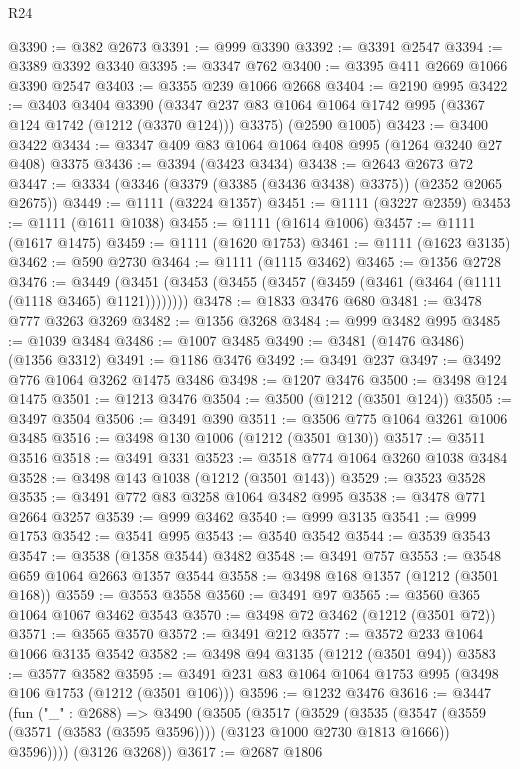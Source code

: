 \begin{lexlean}{R24}
\begin{coremodule}
@3390 := @382 @2673
@3391 := @999 @3390
@3392 := @3391 @2547
@3394 := @3389 @3392 @3340
@3395 := @3347 @762
@3400 := @3395 @411 @2669 @1066 @3390 @2547
@3403 := @3355 @239 @1066 @2668
@3404 := @2190 @995
@3422 := @3403
    @3404
    @3390
    (@3347 @237 @83 @1064 @1064 @1742 @995 (@3367 @124 @1742 (@1212 (@3370 @124))) @3375)
    (@2590 @1005)
@3423 := @3400 @3422
@3434 := @3347 @409 @83 @1064 @1064 @408 @995 (@1264 @3240 @27 @408) @3375
@3436 := @3394 (@3423 @3434)
@3438 := @2643 @2673 @72
@3447 := @3334 (@3346 (@3379 (@3385 (@3436 @3438) @3375)) (@2352 @2065 @2675))
@3449 := @1111 (@3224 @1357)
@3451 := @1111 (@3227 @2359)
@3453 := @1111 (@1611 @1038)
@3455 := @1111 (@1614 @1006)
@3457 := @1111 (@1617 @1475)
@3459 := @1111 (@1620 @1753)
@3461 := @1111 (@1623 @3135)
@3462 := @590 @2730
@3464 := @1111 (@1115 @3462)
@3465 := @1356 @2728
@3476 := @3449 (@3451 (@3453 (@3455 (@3457 (@3459 (@3461 (@3464 (@1111 (@1118 @3465) @1121))))))))
@3478 := @1833 @3476 @680
@3481 := @3478 @777 @3263 @3269
@3482 := @1356 @3268
@3484 := @999 @3482 @995
@3485 := @1039 @3484
@3486 := @1007 @3485
@3490 := @3481 (@1476 @3486) (@1356 @3312)
@3491 := @1186 @3476
@3492 := @3491 @237
@3497 := @3492 @776 @1064 @3262 @1475 @3486
@3498 := @1207 @3476
@3500 := @3498 @124 @1475
@3501 := @1213 @3476
@3504 := @3500 (@1212 (@3501 @124))
@3505 := @3497 @3504
@3506 := @3491 @390
@3511 := @3506 @775 @1064 @3261 @1006 @3485
@3516 := @3498 @130 @1006 (@1212 (@3501 @130))
@3517 := @3511 @3516
@3518 := @3491 @331
@3523 := @3518 @774 @1064 @3260 @1038 @3484
@3528 := @3498 @143 @1038 (@1212 (@3501 @143))
@3529 := @3523 @3528
@3535 := @3491 @772 @83 @3258 @1064 @3482 @995
@3538 := @3478 @771 @2664 @3257
@3539 := @999 @3462
@3540 := @999 @3135
@3541 := @999 @1753
@3542 := @3541 @995
@3543 := @3540 @3542
@3544 := @3539 @3543
@3547 := @3538 (@1358 @3544) @3482
@3548 := @3491 @757
@3553 := @3548 @659 @1064 @2663 @1357 @3544
@3558 := @3498 @168 @1357 (@1212 (@3501 @168))
@3559 := @3553 @3558
@3560 := @3491 @97
@3565 := @3560 @365 @1064 @1067 @3462 @3543
@3570 := @3498 @72 @3462 (@1212 (@3501 @72))
@3571 := @3565 @3570
@3572 := @3491 @212
@3577 := @3572 @233 @1064 @1066 @3135 @3542
@3582 := @3498 @94 @3135 (@1212 (@3501 @94))
@3583 := @3577 @3582
@3595 := @3491 @231 @83 @1064 @1064 @1753 @995 (@3498 @106 @1753 (@1212 (@3501 @106)))
@3596 := @1232 @3476
@3616 := @3447
    (fun ("_" : @2688) =>
    @3490
      (@3505
        (@3517
          (@3529
            (@3535
              (@3547 (@3559 (@3571 (@3583 (@3595 @3596)))) (@3123 @1000 @2730 @1813 @1666))
              @3596))))
      (@3126 @3268))
@3617 := @2687 @1806

\end{coremodule}
\end{lexlean}
